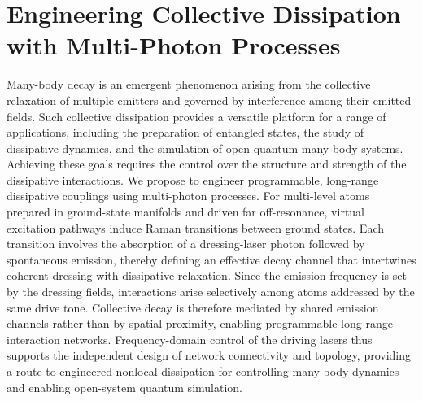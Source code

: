 \documentclass{article}
\begin{document}
\section*{Engineering Collective Dissipation with Multi-Photon Processes}
 
Many-body decay is an emergent phenomenon arising from the collective relaxation of multiple emitters and governed by interference among their emitted fields. Such collective
dissipation provides a versatile platform for a range of applications, including the preparation of entangled states, the study of dissipative dynamics, and the simulation of open
quantum many-body systems. Achieving these goals requires the control over the structure and strength of the dissipative interactions. We propose to engineer programmable, long-range
dissipative couplings using multi-photon processes. For multi-level atoms prepared in ground-state manifolds and driven far off-resonance, virtual excitation pathways induce Raman
transitions between ground states. Each transition involves the absorption of a dressing-laser photon followed by spontaneous emission, thereby defining an effective decay channel
that intertwines coherent dressing with dissipative relaxation. Since the emission frequency is set by the dressing fields, interactions arise selectively among atoms addressed by
the same drive tone. Collective decay is therefore mediated by shared emission channels rather than by spatial proximity, enabling programmable long-range interaction networks.
Frequency-domain control of the driving lasers thus supports the independent design of network connectivity and topology, providing a route to engineered nonlocal dissipation for
controlling many-body dynamics and enabling open-system quantum simulation.
\end{document}
